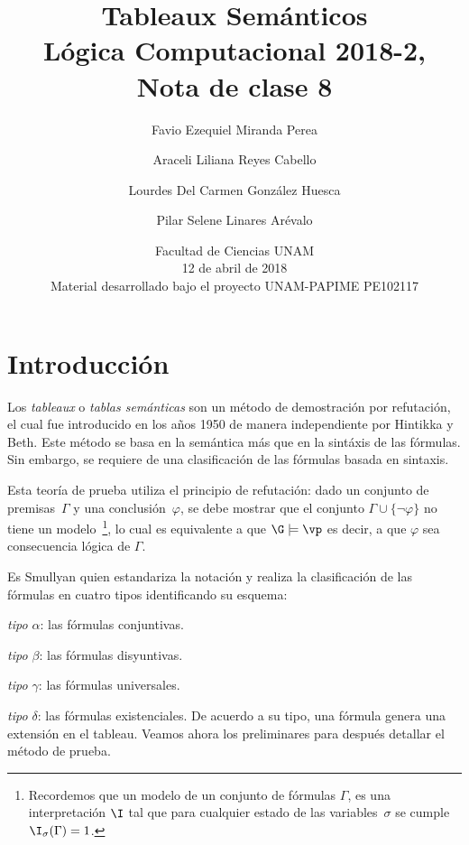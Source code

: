 \documentclass[11pt,letterpaper]{article}
\title{Tableaux Sem\'anticos \\ 
L\'ogica Computacional 2018-2, Nota de clase 8}
\author{Favio Ezequiel Miranda Perea\and Araceli Liliana Reyes Cabello\and
Lourdes Del Carmen Gonz\'alez Huesca \and Pilar Selene Linares Ar\'evalo}
\date{ Facultad de Ciencias UNAM \\ 12 de abril de 2018 \\
Material desarrollado bajo el proyecto UNAM-PAPIME PE102117}
\begin{document}
\maketitle

\section{Introducción}
Los \emph{tableaux} o \emph{tablas semánticas} son un método de
demostración por refutación, el cual fue introducido en los años 1950 
de manera independiente por Hintikka y Beth. 
Este método se basa en la semántica más que en la sintáxis de las fórmulas. Sin
embargo, se requiere de una clasificación de las fórmulas basada en sintaxis.

Esta teor\'ia de prueba utiliza el principio de refutación: dado un 
conjunto de premisas~$\Gamma$ y una conclusión~$\varphi$, se debe mostrar que el
conjunto $\Gamma\cup \{ \lnot \varphi \}$ no tiene un 
modelo~\footnote{Recordemos que un modelo de un conjunto de fórmulas $\Gamma$, 
es una interpretación $\I$ tal que para cualquier estado de las 
variables~$\sigma$ se cumple $\I_\sigma(\Gamma)=1$.},
lo cual es equivalente a que $\G\models\vp$ es decir, a que
$\varphi$ sea consecuencia lógica de $\Gamma$.

Es Smullyan quien estandariza la notación y realiza la clasificación de las
fórmulas en cuatro tipos identificando su esquema:
\bi
\item \emph{tipo $\alpha$}: las fórmulas conjuntivas.
\item \emph{tipo $\beta$}: las fórmulas disyuntivas.
\item \emph{tipo $\gamma$}: las fórmulas universales.
\item \emph{tipo $\delta$}: las f\'ormulas existenciales.
\ei
De acuerdo a su tipo, una fórmula genera una extensión en el tableau. 
Veamos ahora los preliminares para despu\'es detallar el método de prueba.

\end{document}
